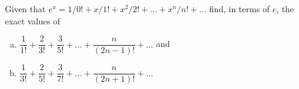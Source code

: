Given that $e^x = 1/0! + x/1! + x^2/2! + \dots + x^n/n! + \dots$ find, in terms
of $e$, the exact values of

\begin{enumerate}[(a)]
\item $\dfrac{1}{1!} + \dfrac{2}{3!} + \dfrac{3}{5!} + \dots + \dfrac{n}{(2n - 1)!} + \dots$ and
\item $\dfrac{1}{3!} + \dfrac{2}{5!} + \dfrac{3}{7!} + \dots + \dfrac{n}{(2n + 1)!} + \dots$
\end{enumerate}
